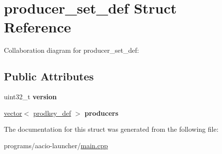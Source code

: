 \hypertarget{structproducer__set__def}{}\section{producer\+\_\+set\+\_\+def Struct Reference}
\label{structproducer__set__def}


Collaboration diagram for producer\+\_\+set\+\_\+def\+:
\subsection*{Public Attributes}
\begin{DoxyCompactItemize}
\item 
\mbox{\label{structproducer__set__def_afe44a00638108164c489aa1786859c58}} 
uint32\+\_\+t {\bfseries version}
\item 
\mbox{\label{structproducer__set__def_ac9c9fce111eaadcfcfb1a28343e49e12}} 
\mbox{\hyperlink{classstd_1_1vector}{vector}}$<$ \mbox{\hyperlink{structprodkey__def}{prodkey\+\_\+def}} $>$ {\bfseries producers}
\end{DoxyCompactItemize}


The documentation for this struct was generated from the following file\+:\begin{DoxyCompactItemize}
\item 
programs/aacio-\/launcher/\mbox{\hyperlink{programs_2aacio-launcher_2main_8cpp}{main.\+cpp}}\end{DoxyCompactItemize}
